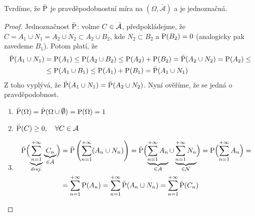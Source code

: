 \begin{remark}
	Tvrdíme, že $\bar{\mathrm{P}}$ je pravděpodobnostní míra na $(\Omega,\bar{\mathcal{A}})$ a je jednoznačná.
	\begin{proof}
		Jednoznačnost $\bar{\mathrm{P}}$: volme $C\in\bar{\mathcal{A}}$, předpokládejme, že  $C=A_1\cup N_1=A_2\cup N_2\subset A_2\cup B_2$, kde $  N_2\subset B_2$ a $\mathrm{P}(B_2)=0$ (analogicky pak zavedeme $B_1$). Potom platí, že 
		\[
		\begin{split}
		\bar{\mathrm{P}}(A_1\cup N_1)&=\mathrm{P}(A_1)\leq \mathrm{P}(A_2\cup B_2)\leq \mathrm{P}(A_2)+\mathrm{P}(B_2)=\bar{\mathrm{P}}(A_2\cup N_2)=\mathrm{P}(A_2)\leq\\ &\leq \mathrm{P}(A_1\cup B_1)\leq  \mathrm{P}(A_1)+\mathrm{P}(B_1)=\bar{\mathrm{P}}(A_1\cup N_1) 
		\end{split}
		\] 
		Z toho vyplývá, že $ \bar{\mathrm{P}}(A_1\cup N_1)=\bar{\mathrm{P}}(A_2\cup N_2) $. Nyní ověříme, že se jedná o pravděpodobnost.
		\begin{enumerate}
			\item $\bar{\PP}(\Omega)=\bar{\PP}(\Omega\cup \emptyset)=\PP(\Omega)=1$
			\item $\bar{\mathrm{P}}(C)\geq 0,~~~\forall C\in\mathcal{A}$
			\item \[
			\begin{split}
			\bar{\mathrm{P}}\Bigl( \underbrace{\sum\limits_{n=1}^{+\infty}}_{disj.}\underbrace{C_n}_{\in\bar{\mathcal{A}}} \Bigr)&=\bar{\mathrm{P}}\left(\sum\limits_{n=1}^{+\infty} (A_n\cup N_n)\right)=\bar{\mathrm{P}}\Bigl( \underbrace{\sum\limits_{n=1}^{+\infty} A_n}_{\in\mathcal{A}}\cup \underbrace{\sum\limits_{n=1}^{+\infty} N_n}_{\in\mathcal{N}} \Bigr)=\mathrm{P}\Bigl( \sum\limits_{n=1}^{+\infty} A_n \Bigr)= \\ &=\sum\limits_{n=1}^{+\infty} \mathrm{P}(A_n) =\sum\limits_{n=1}^{+\infty} \bar{\mathrm{P}}(A_n\cup N_n)=\sum\limits_{n=1}^{+\infty} \bar{\mathrm{P}}(C_n)
			\end{split}
			\] 
		\end{enumerate}
	\end{proof}
\end{remark}

